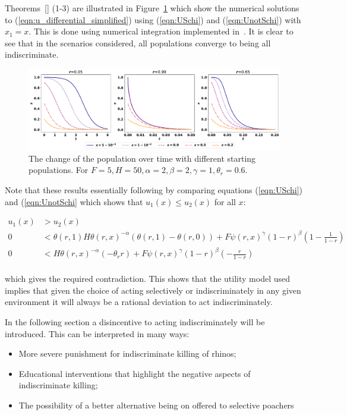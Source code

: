 \documentclass[10pt]{article}
\begin{document}
Theorems~\ref{} (1-3) are illustrated in Figure~\ref{fig:indiscriminate_ess}
which show the numerical solutions to (\ref{eqn:u_differential_simplified})
using (\ref{eqn:USchi}) and  (\ref{eqn:UnotSchi}) with \(x_1=x\).
This is done using numerical integration implemented  in~\cite{scipy}.
It is clear to see that in the scenarios considered, all populations converge 
to being all indiscriminate.

\begin{figure}[!htbp]
    \includegraphics[width=\textwidth]{images/IndiscriminateESS.pdf}
    \caption{\label{fig:indiscriminate_ess} The change of the population over 
    time with different starting populations. For \(F=5, H=50,  
    \alpha=2, \beta=2, \gamma=1, \theta_r=0.6\).}
\end{figure}

Note that these results essentially following by comparing equations (\ref{eqn:USchi})
and (\ref{eqn:UnotSchi} which shows that \(u_1(x) \leq u_2(x)\) for all \(x\):

\begin{align}
    u_1(x) & > u_2(x)\\
    0 & < \theta(r, 1) H \theta(r, x) ^ {-\alpha} \left(\theta(r, 1) - \theta(r, 0)\right) 
    + F\psi(r, x) ^ {\gamma} (1 - r) ^ {\beta} \left(1 - \frac{1}{1 -
    r}\right) \\
    0 & < H \theta(r, x) ^ {-\alpha} \left(-\theta_r r\right)
    + F\psi(r, x) ^ {\gamma} (1 - r) ^ {\beta} \left( - \frac{r}{1 -
    r}\right) \\
\end{align}

which gives the required contradiction. This shows that the utility model used
implies that given the choice of acting selectively or indiscriminately in any
given environment it will always be a rational deviation to act
indiscriminately.

In the following section a disincentive to acting indiscriminately will be
introduced. This can be interpreted in many ways:

\begin{itemize}
    \item More severe punishment for indiscriminate killing of rhinos;
    \item Educational interventions that highlight the negative aspects of
        indiscriminate killing;
    \item The possibility of a better alternative being on offered to selective
        poachers
\end{itemize}
\end{document}

